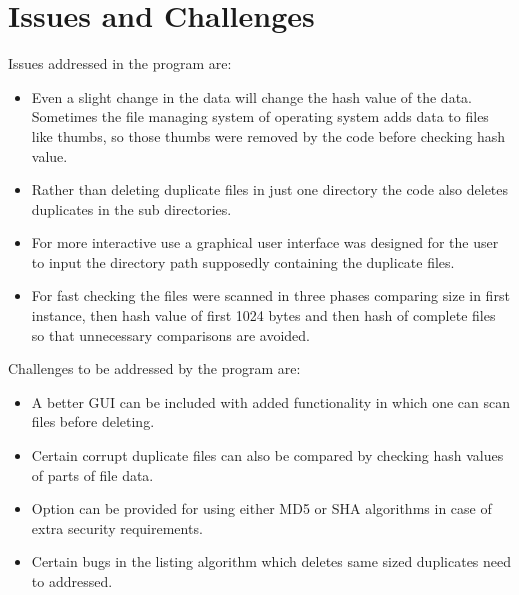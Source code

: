 \chapter{Issues and Challenges}
Issues addressed in the program are:
\begin{itemize}
\item Even a slight change in the data will change the hash value of the data. Sometimes the file managing system of operating system adds data to files like thumbs, so those thumbs were removed by the code before checking hash value.
\item Rather than deleting duplicate files in just one directory the code also deletes duplicates in the sub directories.
\item For more interactive use a graphical user interface was designed for the user to input the directory path supposedly containing the duplicate files.
\item For fast checking the files were scanned in three phases comparing size in first instance, then hash value of first 1024 bytes and then hash of complete files so that unnecessary comparisons are avoided.
\end{itemize}
Challenges to be addressed by the program are:
\begin{itemize}
\item A better GUI can be included with added functionality in which one can scan files before deleting.
\item Certain corrupt duplicate files can also be compared by checking hash values of parts of file data.
\item Option can be provided for using either MD5 or SHA algorithms in case of extra security requirements.
\item Certain bugs in the listing algorithm which deletes same sized duplicates need to addressed.
\end{itemize}